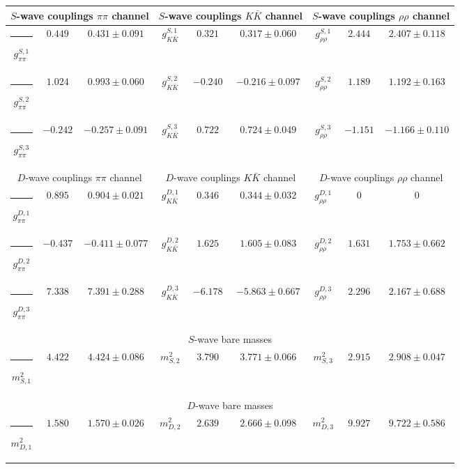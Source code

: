 \begin{table}[h]
\begin{ruledtabular}
\begin{tabular}{c c c c c c c c c}
\multicolumn{3}{c}{$S$-wave couplings $\pi \pi$ channel}  & \multicolumn{3}{c}{$S$-wave couplings $K  \bar K$ channel} & \multicolumn{3}{c}{$S$-wave couplings $\rho\rho$ channel} \\ \hline
\rule[-0.2cm]{-0.1cm}{.55cm} $g^{S,1}_{\pi\pi}$ & $0.449$ & $0.431 \pm 0.091$ & $g^{S,1}_{K\bar K}$ & $0.321$ & $0.317 \pm 0.060$ & $g^{S,1}_{\rho\rho}$ & $2.444$ & $2.407 \pm 0.118$ \\
\rule[-0.2cm]{-0.1cm}{.55cm} $g^{S,2}_{\pi\pi}$ & $1.024$ & $0.993 \pm 0.060$ & $g^{S,2}_{K\bar K}$ & $-0.240$ & $-0.216 \pm 0.097$ & $g^{S,2}_{\rho\rho}$ & $1.189$ & $1.192 \pm 0.163$ \\
\rule[-0.2cm]{-0.1cm}{.55cm} $g^{S,3}_{\pi\pi}$ & $-0.242$ & $-0.257 \pm 0.091$ & $g^{S,3}_{K\bar K}$ & $0.722$ & $0.724 \pm 0.049$ & $g^{S,3}_{\rho\rho}$ & $-1.151$ & $-1.166 \pm 0.110$ \\
\hline 
\multicolumn{3}{c}{$D$-wave couplings $\pi \pi$ channel}  & \multicolumn{3}{c}{$D$-wave couplings $K  \bar K$ channel} & \multicolumn{3}{c}{$D$-wave couplings $\rho\rho$ channel} \\ \hline
\rule[-0.2cm]{-0.1cm}{.55cm} $g^{D,1}_{\pi\pi}$ & $0.895$ & $0.904 \pm 0.021$ & $g^{D,1}_{K\bar K}$ & $0.346$ & $0.344 \pm 0.032$ & $g^{D,1}_{\rho\rho}$ & $0$ & $0$ \\
\rule[-0.2cm]{-0.1cm}{.55cm} $g^{D,2}_{\pi\pi}$ & $-0.437$ & $-0.411 \pm 0.077$ & $g^{D,2}_{K\bar K}$ & $1.625$ & $1.605 \pm 0.083$ & $g^{D,2}_{\rho\rho}$ & $1.631$ & $1.753 \pm 0.662$ \\
\rule[-0.2cm]{-0.1cm}{.55cm} $g^{D,3}_{\pi\pi}$ & $7.338$ & $7.391 \pm 0.288$ & $g^{D,3}_{K\bar K}$ & $-6.178$ & $-5.863 \pm 0.667$ & $g^{D,3}_{\rho\rho}$ & $2.296$ & $2.167 \pm 0.688$ \\
\hline 
\multicolumn{9}{c}{$S$-wave bare masses}   \\ \hline
\rule[-0.2cm]{-0.1cm}{.55cm} $m^2_{S,1}$ & $4.422$ & $4.424 \pm 0.086$ & $m^2_{S,2}$ & $3.790$ & $3.771 \pm 0.066$ & $m^2_{S,3}$ & $2.915$ & $2.908 \pm 0.047$ \\
\hline 
\multicolumn{9}{c}{$D$-wave bare masses}   \\ \hline
\rule[-0.2cm]{-0.1cm}{.55cm} $m^2_{D,1}$ & $1.580$ & $1.570 \pm 0.026$ & $m^2_{D,2}$ & $2.639$ & $2.666 \pm 0.098$ & $m^2_{D,3}$ & $9.927$ & $9.722 \pm 0.586$ \\

\end{tabular}
\end{ruledtabular}
\end{table}
